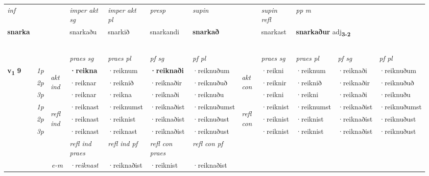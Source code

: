 \begin{longtable}[l]{X>{\footnotesize\itshape}llXXXXlXXXX}
\cmidrule{4-7}
   {\textit{inf}} & &  & \textit{imper akt sg} & \textit{imper akt pl}   & \textit{presp} & \textit{supin} && \textit{supin refl} & \textit{pp m} \\*
  {\textbf{snarka}} & && snarkaðu  & snarkið   & snarkandi &  \textbf{snarkað} && snarkast & \multicolumn{2}{l}{\textbf{snarkaður} adj\textbf{\textsubscript{3-2}}} \\*
 \midrule
& \\*
 & \\*
  & \\*
   & \\*
  & \\
   \midrule
 & &   & \textit{praes sg}  & \textit{praes pl}    & \textit{ pf sg} & \textit{pf pl} & & \textit{praes sg}  & \textit{praes pl}    & \textit{pf sg} & \textit{pf pl }  \\ \cmidrule{4-7} \cmidrule{9-12}
 \multirow{2}{*}{{{\textbf{v{\textsubscript{1}}} \Large{\textbf{9}}}}}  & 1p & \multirow{3}{*}{\begin{turn}{90}\textit{akt ind}\end{turn}} & \textbf{·reikna} & ·reiknum & \textbf{·reiknaði} & ·reiknuðum & \multirow{3}{*}{\begin{turn}{90}\textit{akt con}\end{turn}} &·reikni & ·reiknum & ·reiknaði & ·reiknuðum\\*
 & 2p &  &  ·reiknar  & ·reiknið & ·reiknaðir & ·reiknuðuð & & ·reiknir & ·reiknið & ·reiknaðir & ·reiknuðuð \\*
 & 3p &  & ·reiknar & ·reikna & ·reiknaði & ·reiknuðu & & ·reikni & ·reikni& ·reiknaði & ·reiknuðu \\*
\cmidrule{4-7} \cmidrule{9-12}
 & 1p & \multirow{3}{*}{\begin{turn}{90}\textit{refl ind}\end{turn}}  & ·reiknast & ·reiknumst & ·reiknaðist & ·reiknuðumst & \multirow{3}{*}{\begin{turn}{90}\textit{refl con}\end{turn}}  &·reiknist & ·reiknumst & ·reiknaðist & ·reiknuðumst \\*
 & 2p &  & ·reiknast & ·reiknist & ·reiknaðist & ·reiknuðust & &·reiknist & ·reiknist & ·reiknaðist & ·reiknuðust \\*
 & 3p  & & ·reiknast & ·reiknast & ·reiknaðist & ·reiknuðust & & ·reiknist & ·reiknist& ·reiknaðist & ·reiknuðust \\*
\cmidrule{4-7} \cmidrule{9-12}

 & && \textit{refl ind praes} & \textit{refl ind pf} & \textit{refl con praes} & \textit{refl con pf} \\*
\multicolumn{3}{r}{\textit{e-m}}& ·reiknast & ·reiknaðist & ·reiknist & ·reiknaðist \\*


\end{longtable}

